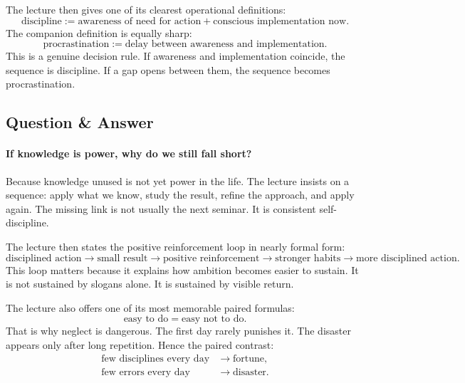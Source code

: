 The lecture then gives one of its clearest operational definitions:
\begin{equation}
\text{discipline} := \text{awareness of need for action} + \text{conscious implementation now}.
\end{equation}
The companion definition is equally sharp:
\begin{equation}
\text{procrastination} := \text{delay between awareness and implementation}.
\end{equation}
This is a genuine decision rule. If awareness and implementation coincide, the sequence is discipline. If a gap opens between them, the sequence becomes procrastination.

\subsection{Question \& Answer}

\paragraph{If knowledge is power, why do we still fall short?}
Because knowledge unused is not yet power in the life. The lecture insists on a sequence: apply what we know, study the result, refine the approach, and apply again. The missing link is not usually the next seminar. It is consistent self-discipline.

The lecture then states the positive reinforcement loop in nearly formal form:
\begin{equation}
\text{disciplined action} \to \text{small result} \to \text{positive reinforcement} \to \text{stronger habits} \to \text{more disciplined action}.
\end{equation}
This loop matters because it explains how ambition becomes easier to sustain. It is not sustained by slogans alone. It is sustained by visible return.

The lecture also offers one of its most memorable paired formulas:
\begin{equation}
\text{easy to do} = \text{easy not to do}.
\end{equation}
That is why neglect is dangerous. The first day rarely punishes it. The disaster appears only after long repetition. Hence the paired contrast:
\begin{align}
\text{few disciplines every day} &\to \text{fortune},\\
\text{few errors every day} &\to \text{disaster}.
\end{align}

